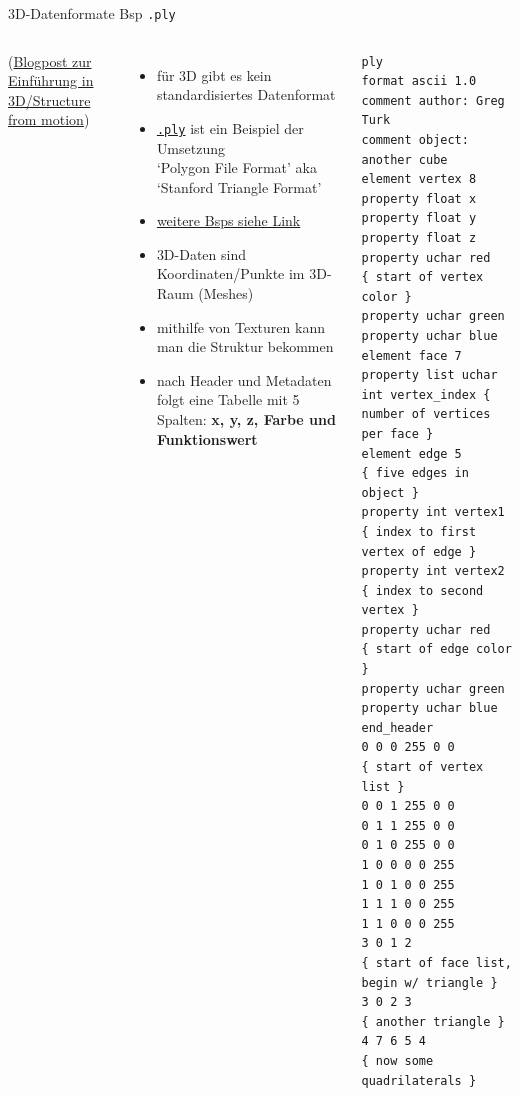 \begin{frame}[fragile]{3D-Datenformate Bsp \texttt{.ply}}

\begin{columns}
\footnotesize
  (\href{https://latex-ninja.com/2019/12/15/an-easy-intro-to-3d-models-from-structure-from-motion-sfm-photogrammetry/}{Blogpost zur Einführung in 3D/Structure from motion})

\begin{itemize}\scriptsize
    \item für 3D gibt es kein standardisiertes Datenformat
    \item \href{http://paulbourke.net/dataformats/ply/}{\texttt{.ply}} ist ein Beispiel der Umsetzung \\ `Polygon File Format' aka `Stanford Triangle Format'
    \item \href{http://paulbourke.net/dataformats/}{weitere Bsps siehe Link}
    \item 3D-Daten sind Koordinaten/Punkte im 3D-Raum (Meshes)
    \item mithilfe von Texturen kann man die Struktur bekommen
    \item nach Header und Metadaten folgt eine Tabelle mit 5 Spalten: \textbf{x, y, z, Farbe und Funktionswert}
\end{itemize}
  \tiny
  \begin{block}{}
  \begin{verbatim}ply
format ascii 1.0
comment author: Greg Turk
comment object: another cube
element vertex 8
property float x
property float y
property float z
property uchar red      { start of vertex color }
property uchar green
property uchar blue
element face 7
property list uchar int vertex_index { number of vertices per face }
element edge 5                       { five edges in object }
property int vertex1                 { index to first vertex of edge }
property int vertex2                 { index to second vertex }
property uchar red                   { start of edge color }
property uchar green
property uchar blue
end_header
0 0 0 255 0 0           { start of vertex list }
0 0 1 255 0 0
0 1 1 255 0 0
0 1 0 255 0 0
1 0 0 0 0 255
1 0 1 0 0 255
1 1 1 0 0 255
1 1 0 0 0 255
3 0 1 2                 { start of face list, begin w/ triangle }
3 0 2 3                 { another triangle }
4 7 6 5 4               { now some quadrilaterals }
\end{verbatim}
  \end{block}
\end{columns}

\end{frame}


